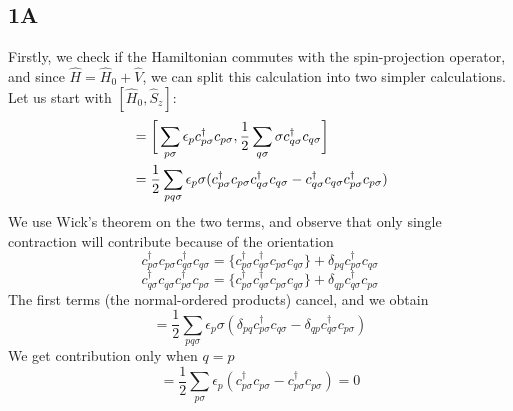 \documentclass[norsk,a4paper,12pt]{article}
\begin{document}
\subsection*{1A}
Firstly, we check if the Hamiltonian commutes with the spin-projection operator, and since $\hat{H}=\hat{H}_0+\hat{V}$, we can split this calculation into two simpler calculations. Let us start with $[\hat{H}_0,\hat{S}_z]$:
\begin{align*}
[\hat{H}_0,\hat{S}_z]&=\bigg[\sum_{p\sigma}\epsilon_pc_{p\sigma}^{\dagger}c_{p\sigma},\frac{1}{2}\sum_{q\sigma}\sigma c_{q\sigma}^{\dagger}c_{q\sigma}\bigg]\notag\\
&=\frac{1}{2}\sum_{pq\sigma}\epsilon_{p}\sigma(c_{p\sigma}^{\dagger}c_{p\sigma}c_{q\sigma}^{\dagger}c_{q\sigma}-c_{q\sigma}^{\dagger}c_{q\sigma}c_{p\sigma}^{\dagger}c_{p\sigma})
\end{align*}
We use Wick's theorem on the two terms, and observe that only single contraction will contribute because of the orientation
\begin{equation*}
c_{p\sigma}^{\dagger}c_{p\sigma}c_{q\sigma}^{\dagger}c_{q\sigma}=\{c_{p\sigma}^{\dagger}c_{q\sigma}^{\dagger}c_{p\sigma}c_{q\sigma}\}+\delta_{pq}c_{p\sigma}^{\dagger}c_{q\sigma}
\end{equation*}
\begin{equation*}
c_{q\sigma}^{\dagger}c_{q\sigma}c_{p\sigma}^{\dagger}c_{p\sigma}=\{c_{p\sigma}^{\dagger}c_{q\sigma}^{\dagger}c_{p\sigma}c_{q\sigma}\}+\delta_{qp}c_{q\sigma}^{\dagger}c_{p\sigma}
\end{equation*}
The first terms (the normal-ordered products) cancel, and we obtain
\begin{equation*}
[\hat{H}_0,\hat{S}_z]=\frac{1}{2}\sum_{pq\sigma}\epsilon_p\sigma(\delta_{pq}c_{p\sigma}^{\dagger}c_{q\sigma}-\delta_{qp}c_{q\sigma}^{\dagger}c_{p\sigma})
\end{equation*}
We get contribution only when $q=p$
\begin{equation*}
[\hat{H}_0,\hat{S}_z]=\frac{1}{2}\sum_{p\sigma}\epsilon_p(c_{p\sigma}^{\dagger}c_{p\sigma}-c_{p\sigma}^{\dagger}c_{p\sigma})=0
\end{equation*}
\end{document}
